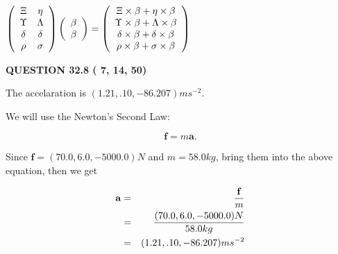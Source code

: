 \documentclass[12pt]{article}
\begin{document}
$  %
 \left( \begin{array}
 {
 c
 c
 }
                    \Xi & 
 \eta \\ 
 \Upsilon & 
 \Lambda \\ 
 \delta & 
 \delta \\ 
 \rho & 
 \sigma
 \end{array} \right)
 \left( \begin{array}
 {
 c
 }
 \beta \\ 
 \beta
 \end{array} \right)
=
  \left( \begin{array}
 {
 c
 }
                    \Xi \times  \beta   +  \eta \times  \beta \\ 
 \Upsilon \times  \beta   +  \Lambda \times  \beta \\ 
 \delta \times  \beta   +  \delta \times  \beta \\ 
 \rho \times  \beta   +  \sigma \times  \beta
 \end{array} \right)
$
 
 
 
 
 
\noindent{}

 
 
  
\vspace{0.2in}
  
{\textbf{\Large{QUESTION
32.8 
 (          7,         14,         50)
}}}
  
  
 
 
\noindent{}
 
 
  The accelaration is $  %
(
1.21,
.10,
-86.207)
ms^{-2} $.
 
 
 
 
 
 
\noindent{}

We will use the Newton's Second Law:
 
\[
\mathbf{f}=m\mathbf{a}.
\]
 
Since $\mathbf{f}= %
(70.0 , 6.0 , -5000.0) N$
and $m= %
58.0kg$, bring them into the above equation, then we get
 
\begin{eqnarray*}
\mathbf{a}&=&\frac{\mathbf{f}}m  \\
&=&\frac{ %
(70.0 , 6.0 , -5000.0) N}{ %
58.0kg}  \\
&=& %
(1.21 , .10 , -86.207) ms^{-2}
\end{eqnarray*}
 
\end{document}
